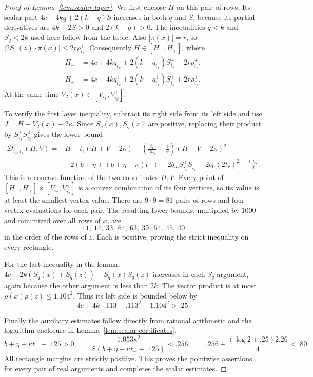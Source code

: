 \begin{proof}[Proof of Lemma~\ref{lem:scalar-layer}]
We first enclose \(H\) on this pair of rows.
Its scalar part \(4c+4kq+2(k-q)S\) increases in both \(q\) and \(S\),
because its partial derivatives are \(4k-2S>0\) and \(2(k-q)>0\).
The inequalities \(q<k\) and \(S_q<2k\) used here follow from the
table. Also \(|\pi(x)|=r\), so
\(|2S_\pi(z)\cdot\pi(x)|\le2r\rho_{i_z}^+\).
Consequently \(H\in[H_-,H_+]\), where
\[
\begin{aligned}
 H_-&=4c+4kq_{i_x}^-+
        2(k-q_{i_x}^-)S_{i_z}^- -2r\rho_{i_z}^+,\\
 H_+&=4c+4kq_{i_x}^++
        2(k-q_{i_x}^+)S_{i_z}^+ +2r\rho_{i_z}^+.
\end{aligned}
\]
At the same time \(V_2(x)\in[V_{i_x}^-,V_{i_x}^+]\).

To verify the first layer inequality, subtract its right side from
its left side and use \(J=H+V_2(x)-2\kappa\).
Since \(S_q(x),S_q(z)\) are positive, replacing their product by
\(S_{i_x}^+S_{i_z}^+\) gives the lower bound
\[
\begin{aligned}
 \mathscr D_{i_x,i_z}(H,V)
 ={}&H+t_c(H+V-2\kappa)
       -\left(\frac{t_r}{2h_s}+\frac1\alpha\right)
          (H+V-2\kappa)^2\\
 &-2(b+\eta+(b+\eta-\kappa)t_-)
   -2b_mS_{i_z}^+S_{i_x}^+
   -2e_0(2t_r)^2-\frac{t_rh_s}{2}.
\end{aligned}
\]
This is a concave function of the two coordinates \(H,V\).
Every point of
\([H_-,H_+]\times[V_{i_x}^-,V_{i_x}^+]\) is a convex combination
of its four vertices, so its value is at least the smallest vertex
value. There are \(9\cdot9=81\) pairs of rows and four vertex
evaluations for each pair. The resulting lower bounds, multiplied
by 1000 and minimized over all rows of \(x\), are
\[
 11,\ 14,\ 33,\ 64,\ 63,\ 39,\ 54,\ 45,\ 40
\]
in the order of the rows of \(z\). Each is positive, proving the
strict inequality on every rectangle.

For the last inequality in the lemma,
\(4c+2k(S_q(x)+S_q(z))-S_q(x)S_q(z)\) increases in each \(S_q\)
argument, again because the other argument is less than \(2k\).
The vector product is at most \(\rho(x)\rho(z)\le1.104^2\).
Thus its left side is bounded below by
\[
 4c+4k\cdot.113-.113^2-1.104^2>.25.
\]


Finally the auxiliary estimates follow directly from rational
arithmetic and the logarithm enclosure in
Lemma~\ref{lem:scalar-certificates}:
\[
 b+\eta+\kappa t_-+.125>0,\qquad
 \frac{1.053\kappa^2}{8(b+\eta+\kappa t_-+.125)}<.256,
 \qquad .256+\frac{(\log2+.25)2.26}{4}<.80.
\]
All rectangle margins are strictly positive. This proves the pointwise
assertions for every pair of real arguments and completes the scalar
estimates.
\end{proof}
